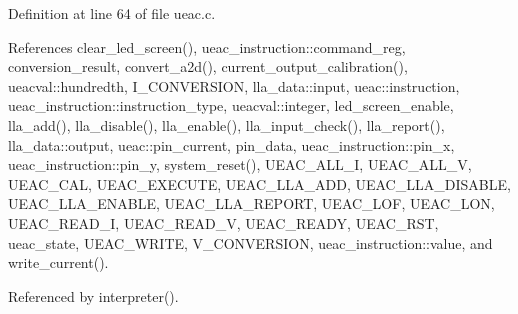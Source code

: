Definition at line 64 of file ueac.c.

References clear\_\-led\_\-screen(), ueac\_\-instruction::command\_\-reg, conversion\_\-result, convert\_\-a2d(), current\_\-output\_\-calibration(), ueacval::hundredth, I\_\-CONVERSION, lla\_\-data::input, ueac::instruction, ueac\_\-instruction::instruction\_\-type, ueacval::integer, led\_\-screen\_\-enable, lla\_\-add(), lla\_\-disable(), lla\_\-enable(), lla\_\-input\_\-check(), lla\_\-report(), lla\_\-data::output, ueac::pin\_\-current, pin\_\-data, ueac\_\-instruction::pin\_\-x, ueac\_\-instruction::pin\_\-y, system\_\-reset(), UEAC\_\-ALL\_\-I, UEAC\_\-ALL\_\-V, UEAC\_\-CAL, UEAC\_\-EXECUTE, UEAC\_\-LLA\_\-ADD, UEAC\_\-LLA\_\-DISABLE, UEAC\_\-LLA\_\-ENABLE, UEAC\_\-LLA\_\-REPORT, UEAC\_\-LOF, UEAC\_\-LON, UEAC\_\-READ\_\-I, UEAC\_\-READ\_\-V, UEAC\_\-READY, UEAC\_\-RST, ueac\_\-state, UEAC\_\-WRITE, V\_\-CONVERSION, ueac\_\-instruction::value, and write\_\-current().

Referenced by interpreter().

